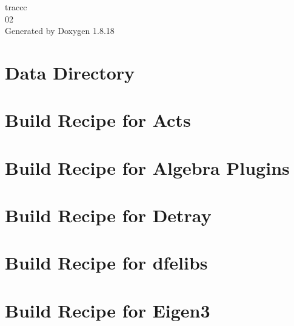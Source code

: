 \let\mypdfximage\pdfximage\def\pdfximage{\immediate\mypdfximage}\documentclass[twoside]{book}
\newcommand{\+}{\discretionary{\mbox{\scriptsize$\hookleftarrow$}}{}{}}
\newcommand{\clearemptydoublepage}{%
  \newpage{\pagestyle{empty}\cleardoublepage}%
}
\begin{document}
\hypersetup{pageanchor=false,
             bookmarksnumbered=true,
             pdfencoding=unicode
            }
\begin{titlepage}
\vspace*{7cm}
\begin{center}%
{\Large traccc \\[1ex]\large 02 }\\
\vspace*{1cm}
{\large Generated by Doxygen 1.8.18}\\
\end{center}
\end{titlepage}
\clearemptydoublepage
{}
\tableofcontents
\clearemptydoublepage
{}
\hypersetup{pageanchor=true}

\chapter{Data Directory}
\label{md_data_README}

\chapter{Build Recipe for Acts}
\label{md_extern_acts_README}

\chapter{Build Recipe for Algebra Plugins}
\label{md_extern_algebra-plugins_README}

\chapter{Build Recipe for Detray}
\label{md_extern_detray_README}

\chapter{Build Recipe for dfelibs}
\label{md_extern_dfelibs_README}

\chapter{Build Recipe for Eigen3}
\label{md_extern_eigen3_README}

\end{document}
